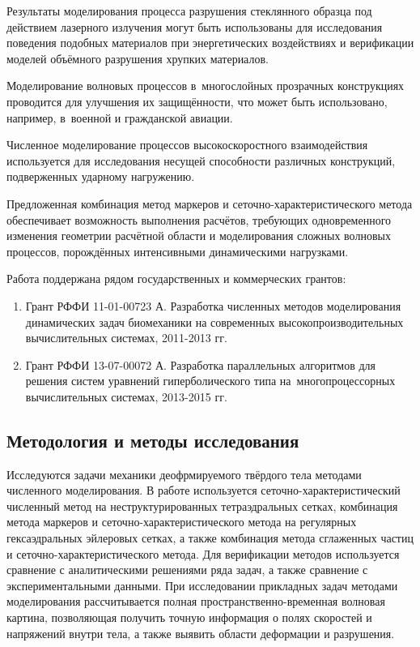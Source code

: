 \documentclass[thesis.tex]{subfiles}
\begin{document}
Результаты моделирования процесса разрушения стеклянного образца под действием лазерного излучения могут быть
использованы для исследования поведения подобных материалов при энергетических воздействиях и верификации моделей
объёмного разрушения хрупких материалов.

Моделирование волновых процессов в~многослойных прозрачных конструкциях проводится для улучшения
их защищённости, что может быть использовано, например, в~военной и гражданской авиации.

Численное моделирование процессов высокоскоростного взаимодейст\-вия используется для исследования несущей
способности различных конструкций, подверженных ударному нагружению.

Предложенная комбинация метод маркеров и сеточно-ха\-рак\-те\-рис\-ти\-чес\-ко\-го метода обеспечивает
возможность выполнения расчётов, требующих одновременного изменения геометрии расчётной области и моделирования
сложных волновых процессов, порождённых интенсивными динамическими нагрузками.

Работа поддержана рядом государственных и коммерческих грантов:
\begin{enumerate}
    \item Грант РФФИ 11-01-00723 А. Разработка численных методов моделирования динамических задач биомеханики на
          современных высокопроизводительных вычислительных системах, 2011-2013 гг.
    \item Грант РФФИ 13-07-00072 А. Разработка параллельных алгоритмов для решения систем уравнений гиперболического
          типа на~многопроцессорных вычислительных системах, 2013-2015 гг.
\end{enumerate}

\subsection*{Методология и методы исследования}

Исследуются задачи механики деофрмируемого твёрдого тела методами численного моделирования. В работе используется
сеточно-ха\-рак\-те\-рис\-ти\-чес\-кий численный метод на неструктурированных тетраэдральных сетках, комбинация метода маркеров
и сеточно-характеристического метода  на регулярных гексаэдральных эйлеровых сетках, а также комбинация метода
сглаженных частиц и сеточно-характеристического метода. Для верификации методов используется сравнение с
аналитическими решениями ряда задач, а также сравнение с экспериментальными данными. При исследовании прикладных
задач методами моделирования рассчитывается полная пространственно-временная волновая картина, позволяющая получить
точную информация о полях скоростей и напряжений внутри тела, а также выявить области деформации и разрушения.
\end{document}

